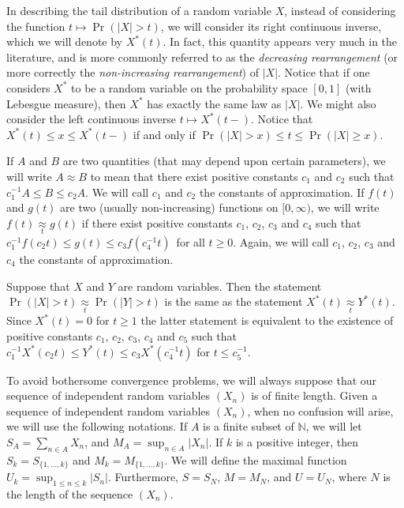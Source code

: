 \documentclass[12pt]{article}
\newcommand{\N}{{\mathbb N}}
\newcommand{\approxsb}[1]{\mathrel{\mathop{\approx}\limits_{#1}}}
\newcommand{\modo}[1]{{\left|#1\right|}}
\newcommand{\smodo}[1]{{\mathopen|#1\mathclose|}}
\begin{document}
In describing the tail distribution of a random variable $X$, instead
of considering 
the function $t \mapsto \Pr(\smodo X > t)$, we will 
consider its right continuous inverse, which we will denote by $X^*(t)$. 
In fact, this
quantity appears very much in the literature, and is more commonly
referred to as the {\em decreasing rearrangement\/} 
(or more correctly the {\em non-increasing rearrangement})
of $\smodo
X$. Notice that if one considers $X^*$ to be a random variable on the
probability space $[0,1]$ (with Lebesgue measure), 
then $X^*$ has exactly the same law as
$\smodo X$.
We might also consider the left continuous inverse $t \mapsto
X^*(t-)$. Notice that $X^*(t) \le x \le X^*(t-)$ if and only if $\Pr(\smodo
X > x) \le t \le \Pr(\smodo X \ge x)$.

If $A$ and $B$ are two quantities (that may depend upon certain 
parameters),  we will write $A \approx B$ to mean that there exist
positive constants $c_1$ and $c_2$ such that $c_1^{-1} A \le B \le c_2
A$. We will call $c_1$ and $c_2$ the constants of approximation. If
$f(t)$ and $g(t)$ are two (usually non-increasing) functions on
$[0,\infty)$, we will write $f(t) \approxsb t g(t)$ if there exist
positive constants $c_1$, $c_2$, $c_3$ and $c_4$ such that $c_1^{-1}
f(c_2 t) \le g(t) \le c_3 f(c_4^{-1} t)$\ for all $t \ge 0$. Again, we
will call $c_1$, $c_2$, $c_3$ and $c_4$ the constants of
approximation.

Suppose that $X$ and $Y$ are random variables. Then the statement 
$\Pr(\smodo X > t) \approxsb t \Pr(\smodo Y > t)$ is the same as the
statement $X^*(t) \approxsb t Y^*(t)$.  Since $X^*(t) = 0$ for $t \ge 1$
the latter statement is equivalent to
the existence of positive constants $c_1$, $c_2$, $c_3$, $c_4$ and
$c_5$ such that $c_1^{-1} X^*(c_2 t) \le Y^*(t) \le c_3 X^*(c_4^{-1}
t)$ 
for $t \le c_5^{-1}$. 

To avoid bothersome convergence problems, we will always suppose that
our sequence of independent random variables $(X_n)$ is of finite
length. Given a sequence of independent random variables $(X_n)$, when
no 
confusion will arise, we will use the following notations. If $A$ is a
finite 
subset of $\N$, we will let $ S_A = \sum_{n \in A} X_n$,  and $M_A = 
\sup_{n \in A} \smodo{X_n}$. If $k$ is a positive integer, then 
$S_k = S_{\{1,\dots,k\}}$ and $M_k = M_{\{1,\dots,k\}}$. We will 
define the maximal function
$U_k = \sup_{1 \le n \le k}\modo{S_n}$. Furthermore, $S = S_N$, $M =
M_N$, and $U = U_N$, where $N$ is the length of the sequence $(X_n)$.
\end{document}
